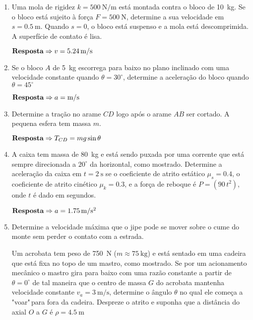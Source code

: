 \documentclass[a4paper,12pt]{article}
\begin{document}
	\begin{enumerate}
		\item Uma mola de rigidez $k=\SI{500}{\newton/\meter}$ está montada contra o bloco de \SI{10}{\kilogram}. Se o bloco está sujeito à força $F=\SI{500}{\newton}$, determine a sua velocidade em $s=\SI{0.5}{\meter}$. Quando $s=0$, o bloco está suspenso e  a mola está descomprimida. A superfície de contato é lisa. 
		
		$\textbf{\text{Resposta}}\Rightarrow v=\SI{5.24}{\meter/\second}$
	
		\item Se o bloco $A$ de \SI{5}{\kilogram} escorrega para baixo no plano inclinado com uma velocidade constante quando $\theta=30^{\circ}$, determine a aceleração do bloco quando $\theta=45^{\circ}$
		
		$\textbf{\text{Resposta}}\Rightarrow a=\SI{}{\meter/\second}$
		
		\item Determine a tração no arame $CD$ logo após o arame $AB$ ser cortado. A pequena esfera tem massa $m$.
	
		$\textbf{\text{Resposta}}\Rightarrow T_{CD}=mg\sin\theta$
		
		\item A caixa tem massa de \SI{80}{\kilogram} e está sendo puxada por uma corrente que está sempre direcionada a $20^{\circ}$ da horizontal, como mostrado. Determine a aceleração da caixa em $t=\SI{2}{\second}$ se o coeficiente de atrito estático $\mu_{s}=0.4$, o coeficiente de atrito cinético $\mu_{k}=0.3$, e a força de reboque é $P=(90\,t^{2})$, onde $t$ é dado em segundos.

		$\textbf{\text{Resposta}}\Rightarrow a=\SI{1.75}{\meter/\second^{2}}$
		
		\item Determine a velocidade máxima que o jipe pode se mover sobre o cume do monte sem perder o contato com a estrada.
		
		Um acrobata tem peso de \SI{750}{\newton} ($m\approx\SI{75}{\kilogram}$) e está sentado em uma cadeira que está fixa no topo de um mastro, como mostrado. Se por um acionamento mecânico o mastro gira para baixo com uma razão constante a partir de $\theta=0^{\circ}$ de tal maneira que o centro de massa $G$ do acrobata mantenha velocidade constante $v_{a}=\SI{3}{\meter/\second}$, determine o ângulo $\theta$ no qual ele começa a "voar"\,para fora da cadeira. Despreze o atrito e suponha que a distância do axial $O$ a $G$ é $\rho=\SI{4.5}{\meter}$
		

\end{enumerate}
\end{document}
